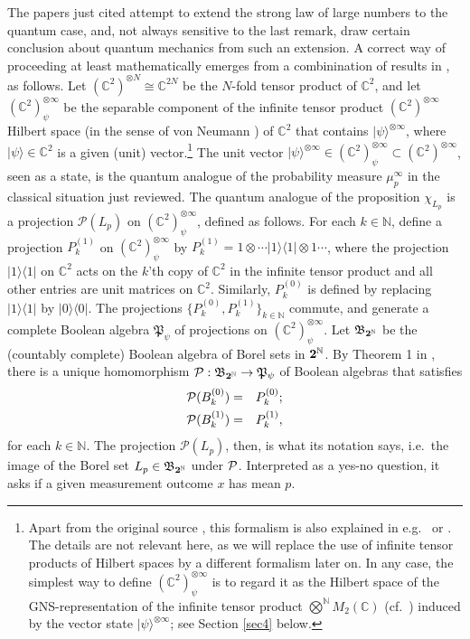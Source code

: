 \documentclass[12pt]{article}
\newcommand{\raw}{\rightarrow} \newcommand{\rat}{\mapsto}
\newcommand{\ot}{\otimes}
\newcommand{\la}{\langle} \newcommand{\ra}{\rangle}
\newcommand{\ch}{\chi} \newcommand{\ps}{\psi} \newcommand{\Ps}{\Psi}
\newcommand{\C}{{\mathbb C}} \newcommand{\D}{{\mathbb D}}
\newcommand{\N}{{\mathbb N}} \newcommand{\R}{{\mathbb R}}
\newcommand{\ut}{{\bf 2}}
\begin{document}
The papers just cited attempt to extend the strong law of large numbers to the quantum case, and, not always sensitive to the last remark, draw certain conclusion about quantum mechanics from such an extension. A correct way of proceeding at least mathematically 
emerges from a combinination of results in \cite{14,vW}, as follows. Let $(\C^2)^{\ot N}\cong \C^{2N}$ be the $N$-fold tensor product of $\C^2$, and let $(\C^2)_{\ps}^{\ot\infty}$ be the separable component of the infinite tensor product $(\C^2)^{\ot\infty}$ Hilbert space (in the sense of von Neumann \cite{vNC}) of $\C^2$ that contains $|\ps\ra^{\ot\infty}$, where $|\ps\ra\in\C^2$ is a given (unit) vector.\footnote{Apart from the original source \cite{vNC}, this formalism is also explained
in e.g.\ \cite{14} or \cite[\S 6.2]{EK}. The details are not relevant here, as we will replace the use of infinite tensor products of Hilbert spaces by a different formalism later on. In any case, the simplest way to define $(\C^2)_{\ps}^{\ot\infty}$ is to regard it as the Hilbert space of the GNS-representation of the infinite tensor product $\bigotimes^{\N} M_2(\C)$ (cf.\ \cite[\S 11.4]{KR2})
induced by  the vector state $|\ps\ra^{\ot\infty}$;
see Section \ref{sec4} below.} The unit vector  $|\ps\ra^{\ot\infty}\in (\C^2)_{\ps}^{\ot\infty}\subset  (\C^2)^{\ot\infty}$, seen as a state, is the quantum analogue of the probability measure $\mu_p^{\infty}$ in the classical situation just reviewed.
The quantum analogue of the proposition $\ch_{L_p}$ is a projection $\mathcal{P}(L_p)$
on $(\C^2)_{\ps}^{\ot\infty}$, defined as follows. For each $k\in \N$, define a projection
$P^{(1)}_k$ on $(\C^2)_{\ps}^{\ot\infty}$ by $P^{(1)}_k=1\ot\cdots |1\ra\la 1|\ot 1\cdots$, where the projection $|1\ra\la 1|$ on $\C^2$ acts on the $k$'th copy of $\C^2$ in the infinite tensor product and all other entries are unit matrices on $\C^2$. Similarly, $P^{(0)}_k$ is defined by replacing $|1\ra\la 1|$ by $|0\ra\la 0|$. 
The projections $\{P^{(0)}_k,P^{(1)}_k\}_{k\in\N}$ commute, and generate a complete Boolean algebra $\mathfrak{P}_{\ps}$ of projections on $(\C^2)_{\ps}^{\ot\infty}$. Let $\mathfrak{B}_{\ut^\N}$ be the (countably complete) Boolean algebra of Borel sets in $\ut^\N$.
By  Theorem 1 in \cite{vW}, there is a  unique homomorphism 
$\CP:\mathfrak{B}_{\ut^\N}\raw \mathfrak{P}_{\ps}$ of Boolean algebras that satisfies
\begin{eqnarray}
{\mathcal P}(B_k^{(0)})&=&P^{(0)}_k;\nonumber\\
{\mathcal P}(B_k^{(1)})&=&P^{(1)}_k,
\end{eqnarray}
for each $k\in\N$.  The projection  $\mathcal{P}(L_p)$, then,
is what its notation says, i.e.\  the image of the Borel set $L_p\in\mathfrak{B}_{\ut^\N}$
 under ${\mathcal P}$. Interpreted as a yes-no question, it asks if a given measurement outcome $x$ has mean $p$.
\end{document}
